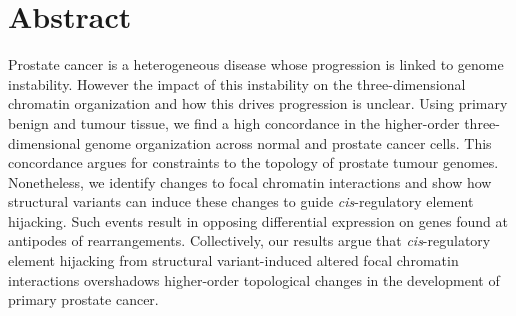 \section{Abstract}

Prostate cancer is a heterogeneous disease whose progression is linked to genome instability.
However the impact of this instability on the three-dimensional chromatin organization and how this drives progression is unclear.
Using primary benign and tumour tissue, we find a high concordance in the higher-order three-dimensional genome organization across normal and prostate cancer cells.
This concordance argues for constraints to the topology of prostate tumour genomes.
Nonetheless, we identify changes to focal chromatin interactions and show how structural variants can induce these changes to guide \emph{cis}-regulatory element hijacking.
Such events result in opposing differential expression on genes found at antipodes of rearrangements.
Collectively, our results argue that \emph{cis}-regulatory element hijacking from structural variant-induced altered focal chromatin interactions overshadows higher-order topological changes in the development of primary prostate cancer.
